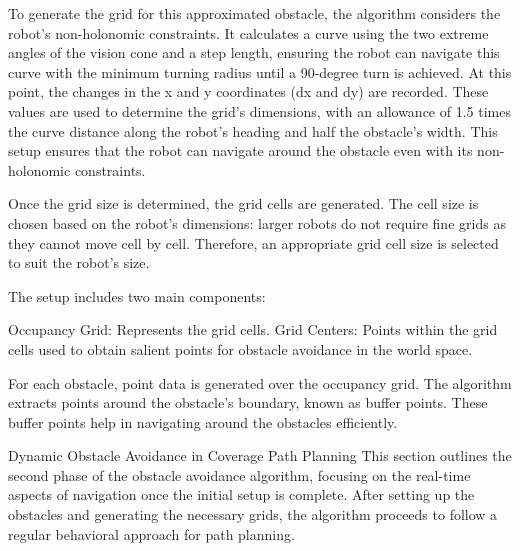\vspace*{6mm}  

To generate the grid for this approximated obstacle, the algorithm considers the robot's non-holonomic constraints. It calculates a curve using the two extreme angles of the vision cone and a step length, ensuring the robot can navigate this curve with the minimum turning radius until a 90-degree turn is achieved. At this point, the changes in the x and y coordinates (dx and dy) are recorded. These values are used to determine the grid's dimensions, with an allowance of 1.5 times the curve distance along the robot's heading and half the obstacle's width. This setup ensures that the robot can navigate around the obstacle even with its non-holonomic constraints.

\vspace*{6mm}  

Once the grid size is determined, the grid cells are generated. The cell size is chosen based on the robot's dimensions: larger robots do not require fine grids as they cannot move cell by cell. Therefore, an appropriate grid cell size is selected to suit the robot's size.

\vspace*{6mm}  

The setup includes two main components:

\vspace*{6mm}  

Occupancy Grid: Represents the grid cells.
Grid Centers: Points within the grid cells used to obtain salient points for obstacle avoidance in the world space. 

\vspace*{6mm}  

For each obstacle, point data is generated over the occupancy grid. The algorithm extracts points around the obstacle's boundary, known as buffer points. These buffer points help in navigating around the obstacles efficiently.


\vspace*{6mm}  













Dynamic Obstacle Avoidance in Coverage Path Planning
This section outlines the second phase of the obstacle avoidance algorithm, focusing on the real-time aspects of navigation once the initial setup is complete. After setting up the obstacles and generating the necessary grids, the algorithm proceeds to follow a regular behavioral approach for path planning.

